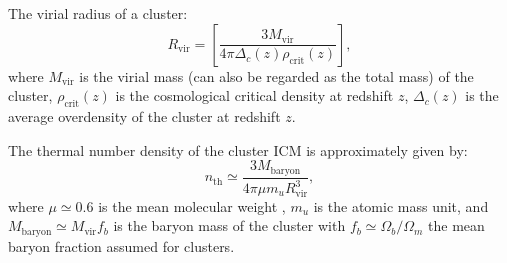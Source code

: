 \documentclass[modern]{aastex61}
\begin{document}
The virial radius of a cluster:
\begin{equation}
  \label{eq:radius-virial}
  R_{\mathrm{vir}} = \left[
    \frac{3 M_{\mathrm{vir}}}{4\pi \Delta_c(z) \rho_{\mathrm{crit}}(z)} \right],
\end{equation}
where $M_{\mathrm{vir}}$ is the virial mass (can also be regarded as
the total mass) of the cluster,
$\rho_{\mathrm{crit}}(z)$ is the cosmological critical density at redshift $z$,
$\Delta_c(z)$ is the average overdensity of the cluster at redshift $z$.

The thermal number density of the cluster ICM is approximately given by:
\begin{equation}
  \label{eq:nth}
  n_{\mathrm{th}} \simeq
    \frac{3 M_{\mathrm{baryon}}}{4\pi \mu m_u R_{\mathrm{vir}}^3},
\end{equation}
where $\mu \simeq 0.6$ is the mean molecular weight \citep{ettori2013},
$m_u$ is the atomic mass unit,
and $M_{\mathrm{baryon}} \simeq M_{\mathrm{vir}} f_b$ is the baryon mass
of the cluster with $f_b \simeq \Omega_b / \Omega_m$ the mean baryon
fraction assumed for clusters.






\end{document}
